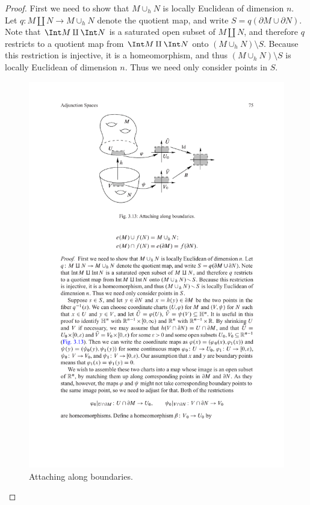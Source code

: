\begin{proof}
First we need to show that $M\cup_h N$ is locally Euclidean of dimension $n$. Let $q:M\amalg N\to M\cup_h N$ denote the quotient map, and write $S=q(\partial M\cup\partial N)$. Note that $\Int M\amalg\Int N$ is a saturated open subset of $M\amalg N$, and therefore $q$ restricts to a quotient map from $\Int M\amalg\Int N$ onto $(M\cup_h N)\setminus S$. Because this restriction is injective, it is a homeomorphism, and thus $(M\cup_hN)\setminus S$ is locally Euclidean of dimension $n$. Thus we need only consider points in $S$.
\begin{figure}[htbp]
\centering
\includegraphics{pictures/attach-manifold}
\caption{Attaching along boundaries.}
\end{figure}


\end{proof}
